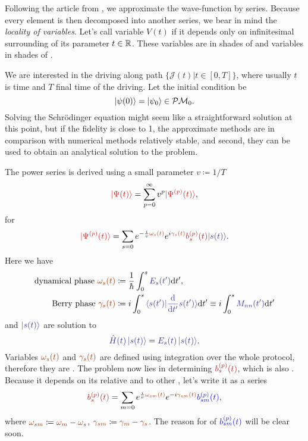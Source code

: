 Following the article from \cite{Rigolin2008}, we approximate the wave-function by series. Because every element is then decomposed into another series, we bear in mind the \emph{locality of variables}. Let's call variable $V(t)$ \emph{} if it depends only on infinitesimal surrounding of its parameter $t\in\mathbb{R}$. These variables are in shades of  and  variables in shades of .

We are interested in the driving along path $\{\mathcal J(t)|t\in[0,T]\}$, where usually $t$ is time and $T$ final time of the driving. Let the initial condition be
\begin{equation}
    \ket{\psi(0)}=\ket{\psi_0}\in \mathcal{P}\mathcal{M}_0.
\end{equation}
Solving the Schr\"odinger equation might seem like a straightforward solution at this point, but if the fidelity is close to 1, the approximate methods are in comparison with numerical methods relatively stable, and second, they can be used to obtain an analytical solution to the problem.

The power series is derived using a small parameter $v\coloneqq 1/T$
\begin{equation}
    \red{\ket{\Psi(t)}}=\sum_{p=0}^\infty v^p \red{\ket{\Psi^{(p)}(t)}},
    \label{eq:mainSeries}
\end{equation}
for 
\begin{equation}
    \red{\ket{\Psi^{(p)}(t)}}=\sum_{s=0} e^{-\frac{i}{v} \reddd{\omega_s(t)}}e^{i\reddd{\gamma_s(t)}}\redd{b_s^{(p)}(t)}\bluee{\ket{s(t)}}.
\end{equation}
Here we have
\begin{align}
    \text{dynamical phase }\reddd{\omega_s(t)} &\coloneqq \frac{1}{\hbar}\int_0^s \bluee{E_s(t')}\d t',\\
    \text{Berry phase }\reddd{\gamma_s(t)} &\coloneqq i\int_0^s \bluee{\braket{s(t')|\frac{\d}{\d t'}s(t')}}\d t' \equiv i\int_0^s \bluee{M_{nn}(t')}\d t'
    \label{eq:gammadef}
\end{align}
and $\bluee{\ket{s(t)}}$ are solution to
\begin{equation}
    \bluee{\HH(t)\ket{s(t)}}=\bluee{E_s(t) \ket{s(t)}}.
\end{equation}
Variables $\reddd{\omega_s(t)}$ and $\reddd{\gamma_s(t)}$ are defined using integration over the whole protocol, therefore they are \emph{}.
The problem now lies in determining $\redd{b_s^{(p)}(t)}$, which is also . Because it depends on its relative  and  to other , let's write it as a series
\begin{equation}
    \redd{b_s^{(p)}(t)}=\sum_{m=0} e^{\frac{i}{v}\reddd{\omega_{sm}(t)}}e^{-i\reddd{\gamma_{sm}(t)}}\blue{b_{sm}^{(p)}(t)},
    \label{eq:bnAPT}
\end{equation}
where $\reddd{\omega_{sm}} \coloneqq \reddd{\omega_m}-\reddd{\omega_s}$, $\reddd{\gamma_{sm}} \coloneqq \reddd{\gamma_m}-\reddd{\gamma_s}$.  The reason for  of $\blue{b_{sm}^{(p)}(t)}$ will be clear soon.

